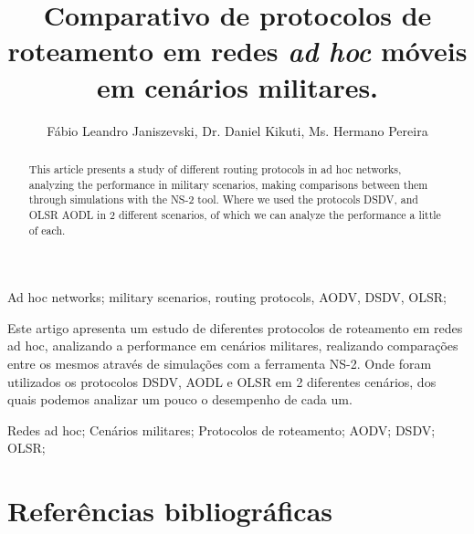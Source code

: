 \documentclass[12pt]{article}
\title{Comparativo de protocolos de roteamento em redes \textit{ad hoc} m\'oveis em cen\'arios militares.}
\author{
	F\'abio Leandro Janiszevski\inst{1}, 
	Dr. Daniel Kikuti\inst{1}, 
	Ms. Hermano Pereira\inst{2}
}
\begin{document}
  \setlength{\leftmargini}{1.70cm}
  \setlength{\labelsep}{.5em}
  \setlength{\parindent}{1.27cm}
  \setlength{\parskip}{6pt}

\maketitle

\begin{abstract}
This article presents a study of different routing protocols in ad hoc networks, analyzing the performance in military scenarios, making comparisons between them through simulations with the NS-2 tool.
Where we used the protocols DSDV, and OLSR AODL in 2 different scenarios, of which we can analyze the performance a little of each.
\end{abstract}

\begin{keyWord}
Ad hoc networks; military scenarios, routing protocols, AODV, DSDV, OLSR;
\end{keyWord}

\begin{resumo}
Este artigo apresenta um estudo de diferentes protocolos de roteamento em redes ad hoc, analizando a performance em cen\'arios militares, realizando compara\c{c}\~oes entre os mesmos atrav\'es de simula\c{c}\~oes com a ferramenta NS-2. 
Onde foram utilizados os protocolos DSDV, AODL e OLSR em 2 diferentes cen\'arios, dos quais podemos analizar um pouco o desempenho de cada um.
\end{resumo}

\begin{palavraChave}
Redes ad hoc; Cen\'arios militares; Protocolos de roteamento; AODV; DSDV; OLSR;
\end{palavraChave}

\singlespacing

\newpage
\section{Refer\^encias bibliogr\'aficas}
%

\def\bibindent{0.5cm}
\renewcommand{\emph}{\textbf}

\end{document}
